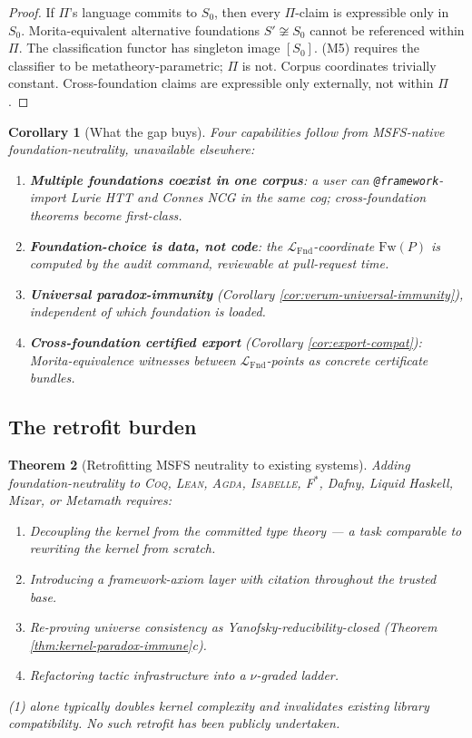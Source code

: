 \documentclass[11pt, a4paper]{article}
\newtheorem{theorem}{Theorem}[section]
\newtheorem{corollary}[theorem]{Corollary}
\theoremstyle{definition}
\theoremstyle{remark}
\newcommand{\LFnd}{\mathcal{L}_{\mathrm{Fnd}}}
\newcommand{\Coq}{\textsc{Coq}}
\newcommand{\Lean}{\textsc{Lean}}
\newcommand{\Agda}{\textsc{Agda}}
\newcommand{\Isabelle}{\textsc{Isabelle}}
\newcommand{\Fstar}{\textsc{F$^\ast$}}
\begin{document}
\begin{proof}
If $\Pi$'s language commits to $S_0$, then every $\Pi$-claim is expressible only in $S_0$. Morita-equivalent alternative foundations $S' \not\cong S_0$ cannot be referenced within $\Pi$. The classification functor has singleton image $[S_0]$. (M5) requires the classifier to be metatheory-parametric; $\Pi$ is not. Corpus coordinates trivially constant. Cross-foundation claims are expressible only externally, not within $\Pi$.
\end{proof}

\begin{corollary}[What the gap buys]
\label{cor:gap-buys}
Four capabilities follow from MSFS-native foundation-neutrality, unavailable elsewhere:
\begin{enumerate}[label=(A\arabic*), nosep]
\item \textbf{Multiple foundations coexist in one corpus}: a user can \texttt{@framework}-import Lurie HTT and Connes NCG in the same cog; cross-foundation theorems become first-class.
\item \textbf{Foundation-choice is data, not code}: the $\LFnd$-coordinate $\mathrm{Fw}(P)$ is computed by the audit command, reviewable at pull-request time.
\item \textbf{Universal paradox-immunity} (Corollary \ref{cor:verum-universal-immunity}), independent of which foundation is loaded.
\item \textbf{Cross-foundation certified export} (Corollary \ref{cor:export-compat}): Morita-equivalence witnesses between $\LFnd$-points as concrete certificate bundles.
\end{enumerate}
\end{corollary}

\subsection{The retrofit burden}

\begin{theorem}[Retrofitting MSFS neutrality to existing systems]
\label{thm:retrofit}
Adding foundation-neutrality to \Coq, \Lean, \Agda, \Isabelle, \Fstar, Dafny, Liquid Haskell, Mizar, or Metamath requires:
\begin{enumerate}[nosep]
\item Decoupling the kernel from the committed type theory --- a task comparable to rewriting the kernel from scratch.
\item Introducing a framework-axiom layer with citation throughout the trusted base.
\item Re-proving universe consistency as Yanofsky-reducibility-closed (Theorem \ref{thm:kernel-paradox-immune}c).
\item Refactoring tactic infrastructure into a $\nu$-graded ladder.
\end{enumerate}
(1) alone typically doubles kernel complexity and invalidates existing library compatibility. No such retrofit has been publicly undertaken.
\end{theorem}
\end{document}
